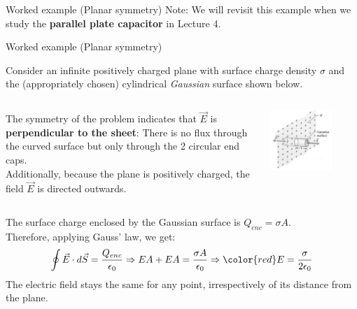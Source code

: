 {\begin{frame}{Worked example (Planar symmetry)}
  Note: We will revisit this example when we study the {\bf parallel plate capacitor}
  in Lecture 4.\\

\end{frame}

%
%
%

\begin{frame}{Worked example (Planar symmetry)}

  Consider an infinite positively charged plane with surface charge density
  $\sigma$ and the (appropriately chosen)
  cylindrical {\em Gaussian} surface shown below.\\

  \begin{columns}
   \begin{column}{0.60\textwidth}
    The symmetry of the problem indicates that $\vec{E}$ is
    {\bf perpendicular to the sheet}: There is no
    flux through the curved surface but only through the 2 circular end caps.\\
    \vspace{0.2cm}
    Additionally, because the plane is positively charged, the field $\vec{E}$
    is directed outwards.\\
   \end{column}
   \begin{column}{0.40\textwidth}
    \begin{center}
      \includegraphics[width=0.70\textwidth]{./images/problems/lect02_charged_plane_3d.png}\\
    \end{center}
   \end{column}
  \end{columns}
  The surface charge enclosed by the Gaussian surface is $Q_{enc} = \sigma A$.\\
  \vspace{0.2cm}
  Therefore, applying Gauss' law, we get:
  \begin{equation*}
    \oint \vec{E} \cdot d\vec{S} = \frac{Q_{enc}}{\epsilon_0} \Rightarrow
    EA + EA = \frac{\sigma A}{\epsilon_0} \Rightarrow
    {\color{red}
      E = \frac{\sigma}{2\epsilon_0}
    }
  \end{equation*}
  The electric field stays the same for any point, irrespectively of its distance from the plane.


\end{frame}}
